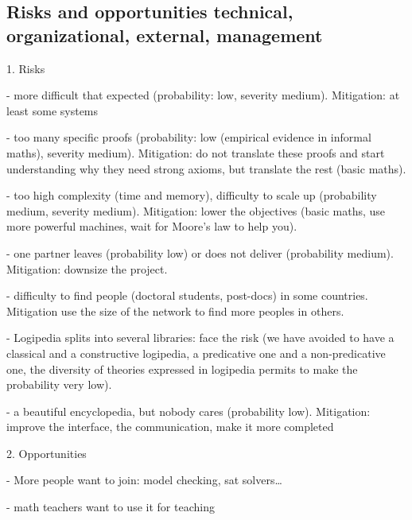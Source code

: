 \subsection{Risks and opportunities technical, organizational, external, management}

1. Risks

- more difficult that expected (probability: low, severity medium). Mitigation: at least some systems

- too many specific proofs (probability: low (empirical evidence in informal maths), severity medium). Mitigation: do not translate these proofs and start understanding why they need strong axioms, but translate the rest (basic maths).

- too high complexity (time and memory), difficulty to scale up (probability medium, severity medium). Mitigation: lower the objectives (basic maths, use more powerful machines, wait for Moore's law to help you).

- one partner leaves (probability low) or does not deliver (probability medium). Mitigation: downsize the project.

- difficulty to find people (doctoral students, post-docs) in some countries. Mitigation use the size of the network to find more peoples in others.

- Logipedia splits into several libraries: face the risk  (we have avoided to have a classical and a constructive logipedia, a predicative one and a non-predicative one, the diversity of theories expressed in logipedia permits to make the probability very low). 

- a beautiful encyclopedia, but nobody cares (probability low). Mitigation: improve the interface, the communication, make it more completed

2.  Opportunities

- More people want to join: model checking, sat solvers… 

- math teachers want to use it for teaching


